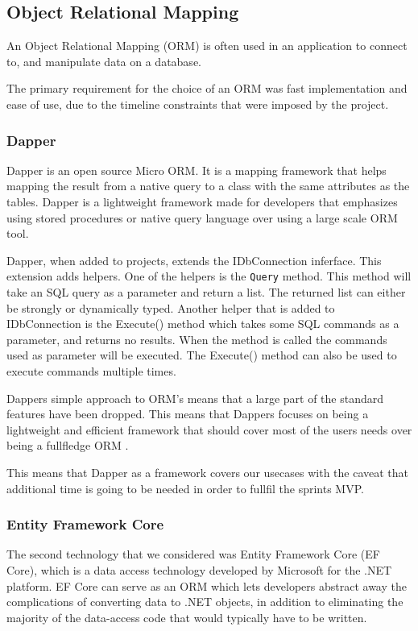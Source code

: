 \subsection{Object Relational Mapping}
An Object Relational Mapping (ORM) is often used in an application to connect to, and manipulate data on a database.

The primary requirement for the choice of an ORM was fast implementation and ease of use, due to the timeline constraints that were imposed by the \knox{} project. 

\subsubsection{Dapper}
Dapper is an open source Micro ORM. It is a mapping framework that helps mapping the result from a native query to a class with the same attributes as the tables. Dapper is a lightweight framework made for developers that emphasizes using stored procedures or native query language over using a large scale ORM tool. 


Dapper, when added to projects, extends the IDbConnection inferface. This extension adds helpers. 
One of the helpers is the \texttt{Query} method. This method will take an SQL query as a parameter and return a list. The returned list can either be strongly or dynamically typed.
Another helper that is added to IDbConnection is the Execute() method which takes some SQL commands as a parameter, and returns no results. When the method is called the commands used as parameter will be executed. The Execute() method can also be used to execute commands multiple times\cite{Dapper_Git}.

Dappers simple approach to ORM's means that a large part of the standard features have been dropped. This means that Dappers focuses on being a lightweight and efficient framework that should cover most of the users needs over being a fullfledge ORM \cite{Dapper_Git}.

This means that Dapper as a framework covers our usecases with the caveat that additional time is going to be needed in order to fullfil the sprints MVP. 

\subsubsection{Entity Framework Core}
The second technology that we considered was Entity Framework Core (EF Core), which is a data access technology developed by Microsoft for the .NET platform. EF Core can serve as an ORM \cite{Object_relational_mapping} which lets developers abstract away the complications of converting data to .NET objects, in addition to eliminating the majority of the data-access code that would typically have to be written.

